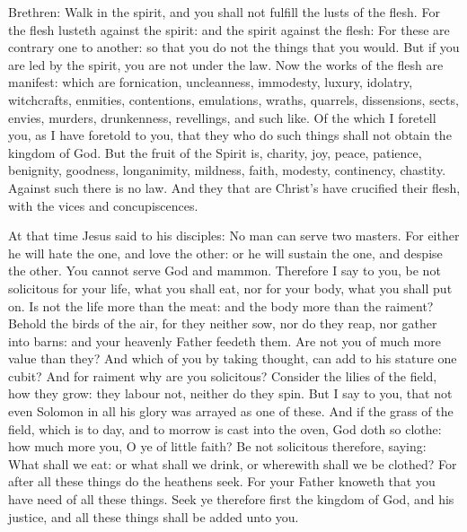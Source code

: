 \begin{multicols}{2}
Brethren: Walk in the spirit, and you shall not fulfill the
lusts of the flesh.
For the flesh lusteth against the spirit: and the spirit against
the flesh: For these are contrary one to another: so that you do not the
things that you would.
But if you are led by the spirit, you are not under the law.
Now the works of the flesh are manifest: which are fornication,
uncleanness, immodesty, luxury,
idolatry, witchcrafts, enmities, contentions, emulations, wraths,
quarrels, dissensions, sects,
envies, murders, drunkenness, revellings, and such like.  Of the
which I foretell you, as I have foretold to you, that they who do such
things shall not obtain the kingdom of God.
But the fruit of the Spirit is, charity, joy, peace, patience,
benignity, goodness, longanimity,
mildness, faith, modesty, continency, chastity. Against such there
is no law.
And they that are Christ's have crucified their flesh, with the
vices and concupiscences.



At that time Jesus said to his disciples:
No man can serve two masters. For either he will hate the one, and
love the other: or he will sustain the one, and despise the other. You
cannot serve God and mammon.
Therefore I say to you, be not solicitous for your life, what you
shall eat, nor for your body, what you shall put on.  Is not the life
more than the meat: and the body more than the raiment?
Behold the birds of the air, for they neither sow, nor do they
reap, nor gather into barns: and your heavenly Father feedeth them. Are
not you of much more value than they?
And which of you by taking thought, can add to his stature one
cubit?
And for raiment why are you solicitous? Consider the lilies of the
field, how they grow: they labour not, neither do they spin.
But I say to you, that not even Solomon in all his glory was
arrayed as one of these.
And if the grass of the field, which is to day, and to morrow is
cast into the oven, God doth so clothe: how much more you, O ye of
little faith?
Be not solicitous therefore, saying: What shall we eat: or what
shall we drink, or wherewith shall we be clothed?
For after all these things do the heathens seek. For your Father
knoweth that you have need of all these things.
Seek ye therefore first the kingdom of God, and his justice, and
all these things shall be added unto you.


\bigskip



\end{multicols}
